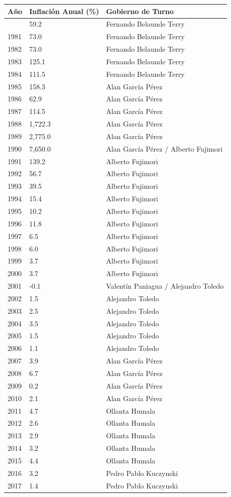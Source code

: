 \documentclass[
  stu,
  floatsintext,
  longtable,
  a4paper,
  nolmodern,
  notxfonts,
  notimes,
  12pt,
  colorlinks=true,linkcolor=blue,citecolor=blue,urlcolor=blue]{apa7}
\newcounter{none} %
\begin{document}
{\def\LTcaptype{none} %
\begin{longtable}[]{@{}lll@{}}
\toprule\noalign{}
Año & Inflación Anual (\%) & Gobierno de Turno \\
\midrule\noalign{}
\endhead
\bottomrule\noalign{}
\endlastfoot
1980 & 59.2 & Fernando Belaunde Terry \\
1981 & 73.0 & Fernando Belaunde Terry \\
1982 & 73.0 & Fernando Belaunde Terry \\
1983 & 125.1 & Fernando Belaunde Terry \\
1984 & 111.5 & Fernando Belaunde Terry \\
1985 & 158.3 & Alan García Pérez \\
1986 & 62.9 & Alan García Pérez \\
1987 & 114.5 & Alan García Pérez \\
1988 & 1,722.3 & Alan García Pérez \\
1989 & 2,775.0 & Alan García Pérez \\
1990 & 7,650.0 & Alan García Pérez / Alberto Fujimori \\
1991 & 139.2 & Alberto Fujimori \\
1992 & 56.7 & Alberto Fujimori \\
1993 & 39.5 & Alberto Fujimori \\
1994 & 15.4 & Alberto Fujimori \\
1995 & 10.2 & Alberto Fujimori \\
1996 & 11.8 & Alberto Fujimori \\
1997 & 6.5 & Alberto Fujimori \\
1998 & 6.0 & Alberto Fujimori \\
1999 & 3.7 & Alberto Fujimori \\
2000 & 3.7 & Alberto Fujimori \\
2001 & -0.1 & Valentín Paniagua / Alejandro Toledo \\
2002 & 1.5 & Alejandro Toledo \\
2003 & 2.5 & Alejandro Toledo \\
2004 & 3.5 & Alejandro Toledo \\
2005 & 1.5 & Alejandro Toledo \\
2006 & 1.1 & Alejandro Toledo \\
2007 & 3.9 & Alan García Pérez \\
2008 & 6.7 & Alan García Pérez \\
2009 & 0.2 & Alan García Pérez \\
2010 & 2.1 & Alan García Pérez \\
2011 & 4.7 & Ollanta Humala \\
2012 & 2.6 & Ollanta Humala \\
2013 & 2.9 & Ollanta Humala \\
2014 & 3.2 & Ollanta Humala \\
2015 & 4.4 & Ollanta Humala \\
2016 & 3.2 & Pedro Pablo Kuczynski \\
2017 & 1.4 & Pedro Pablo Kuczynski \\
\end{longtable}
}
\end{document}
